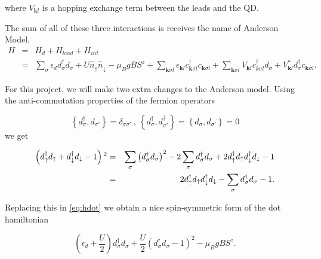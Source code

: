 
where $V_{\mathbf{k}l}$ is a hopping exchange
term between the leads and the QD. 


The sum of all of these three interactions is receives the name of Anderson Model. 
\begin{eqnarray}
H & = & H_{d}+H_{lead}+H_{int}\nonumber \\
 & = & \sum_{\sigma}\epsilon_{d}d_{\sigma}^{\dagger}d_{\sigma}+U\hat{n}_{\uparrow}\hat{n}_{\downarrow}-\mu_{B}gBS^{z}+\sum_{\mathbf{k}\sigma l}\epsilon_{\mathbf{k}l}c_{\mathbf{k}\sigma l}^{\dagger}c_{\mathbf{k}\sigma l}+\sum_{\mathbf{k}\sigma l}V_{\mathbf{k}l}c_{k\sigma l}^{\dagger}d_{\sigma}+V_{\mathbf{k}l}^{*}d_{\sigma}^{\dagger}c_{\mathbf{k}\sigma l}.\label{eq:Anderson}
\end{eqnarray}

For this project, we will make two extra changes to the Anderson model. Using the anti-commutation properties of the fermion operators

\[
\left\{ d_{\sigma}^{\dagger},d_{\sigma'}\right\} =\delta_{\sigma\sigma'}\ ,\ \left\{ d_{\sigma}^{\dagger},d_{\sigma'}^{\dagger}\right\} =\left\{ d_{\sigma},d_{\sigma'}\right\} =0
\]
we get


\begin{eqnarray*}
\left(d_{\uparrow}^{\dagger}d_{\uparrow}+d_{\downarrow}^{\dagger}d_{\downarrow}-1\right){}^{2} & = & \sum_{\sigma}\left(d_{\sigma}^{\dagger}d_{\sigma}\right)^{2}-2\sum_{\sigma}d_{\sigma}^{\dagger}d_{\sigma}+2d_{\uparrow}^{\dagger}d_{\uparrow}d_{\downarrow}^{\dagger}d_{\downarrow}-1\\
 & = & 2d_{\uparrow}^{\dagger}d_{\uparrow}d_{\downarrow}^{\dagger}d_{\downarrow}-\sum_{\sigma}d_{\sigma}^{\dagger}d_{\sigma}-1.
\end{eqnarray*}

Replacing this in \eqref{eq:hdot} we obtain a  nice spin-symmetric form of the dot hamiltonian

\begin{equation}
    \left(\epsilon_{d}+\frac{U}{2}\right)d_{\sigma}^{\dagger}d_{\sigma}+\frac{U}{2}(d_{\sigma}^{\dagger}d_{\sigma}-1)^{2}-\mu_{B}gBS^{z}. 
    \label{eq:hdot2}
\end{equation}

